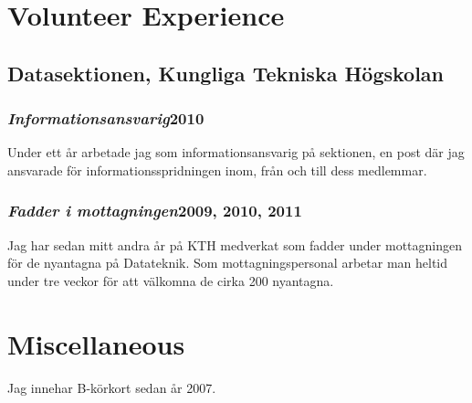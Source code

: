\documentclass[a4paper,10pt]{article}
\newcommand{\workplace}[1]{\textsl{#1}}
\newcommand{\duration}[1]{\textbf{#1}}
\newcommand{\theplace}[2][]{\subsection*{\textbf{#2}#1}}
\newcommand{\thework}[2]{\subsubsection*{\workplace{#1}\hfill\duration{#2}}\par}
\begin{document}
\section*{Volunteer Experience}
\theplace[, Kungliga Tekniska Högskolan]{Datasektionen}

\thework{Informationsansvarig}{2010}
Under ett år arbetade jag som informationsansvarig på sektionen, en post där jag ansvarade för informationsspridningen inom, från och till dess medlemmar.

\thework{Fadder i mottagningen}{2009, 2010, 2011}
Jag har sedan mitt andra år på KTH medverkat som fadder under mottagningen för de nyantagna på Datateknik. Som mottagningspersonal arbetar man heltid under tre veckor för att välkomna de cirka 200 nyantagna.

\section*{Miscellaneous}
Jag innehar B-körkort sedan år 2007.
\end{document}

